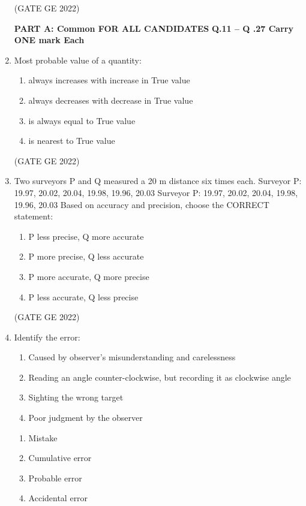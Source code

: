 \documentclass[a4paper, 11pt]{article}
\begin{document}
\begin{enumerate}
\hfill (GATE GE 2022)

\textbf{PART A: Common FOR ALL CANDIDATES}
\textbf{Q.11 – Q .27 Carry ONE mark Each}

\item Most probable value of a quantity:
\begin{enumerate}
    \item always increases with increase in True value
    \item always decreases with decrease in True value
    \item is always equal to True value
    \item is nearest to True value
\end{enumerate}

\hfill (GATE GE 2022)

\item Two surveyors P and Q measured a 20 m distance six times each.
Surveyor P: 19.97, 20.02, 20.04, 19.98, 19.96, 20.03
Surveyor P: 19.97, 20.02, 20.04, 19.98, 19.96, 20.03
Based on accuracy and precision, choose the CORRECT statement:
\begin{enumerate}
    \item P less precise, Q more accurate
    \item P more precise, Q less accurate
    \item P more accurate, Q more precise
    \item P less accurate, Q less precise
\end{enumerate}

\hfill (GATE GE 2022)

\item Identify the error:
\begin{enumerate}
\item Caused by observer’s misunderstanding and carelessness 
\item Reading an angle counter-clockwise, but recording it as clockwise angle 
\item Sighting the wrong target 
\item Poor judgment by the observer 
\end{enumerate}

\begin{enumerate}
    \item Mistake
    \item Cumulative error
    \item Probable error
    \item Accidental error
\end{enumerate}


\end{enumerate}
\end{document}
